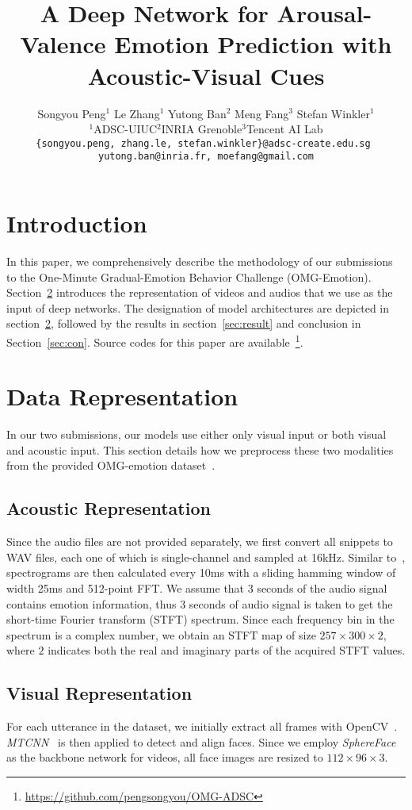 \documentclass[a4paper, 10pt, conference]{ieeeconf}      %
\title{\Large\bf
A Deep Network for Arousal-Valence Emotion Prediction with Acoustic-Visual Cues 
}
\author{Songyou Peng$^{1}$ \qquad Le Zhang$^{1}$ \qquad Yutong Ban$^{2}$ \qquad Meng Fang$^{3}$ \qquad Stefan Winkler$^{1}$%
\\
{$^{1}$ADSC-UIUC\qquad $^{2}$INRIA Grenoble\qquad $^{3}$Tencent AI Lab}\\
{\tt\footnotesize \{songyou.peng, zhang.le, stefan.winkler\}@adsc-create.edu.sg 
}\\
{\tt\footnotesize yutong.ban@inria.fr, moefang@gmail.com}
}
\begin{document}
\maketitle
\thispagestyle{empty}
\pagestyle{empty}
\section{Introduction}
In this paper, we comprehensively describe the methodology of our submissions to the One-Minute Gradual-Emotion Behavior Challenge (OMG-Emotion).
Section~\ref{sec:data} introduces the representation of videos and audios that we use as the input of deep networks. 
The designation of model architectures are depicted in section~\ref{sec:data}, followed by the results in section~\ref{sec:result} and conclusion in Section~\ref{sec:con}. Source codes for this paper are available~\footnote{\url{https://github.com/pengsongyou/OMG-ADSC}}.

\section{Data Representation}
\label{sec:data}
In our two submissions, our models use either only visual input or both visual and acoustic input.
This section details how we preprocess these two modalities from the provided OMG-emotion dataset~\cite{barros2018omg}.

\subsection{Acoustic Representation}
Since the audio files are not provided separately, we first convert all snippets to WAV files, each one of which is single-channel and sampled at 16kHz.
Similar to~\cite{Nagrani17}, spectrograms are then calculated every 10ms with a sliding hamming window of width 25ms and 512-point FFT.
We assume that 3 seconds of the audio signal contains emotion information, thus 3 seconds of audio signal is taken to get the short-time Fourier transform (STFT) spectrum. Since each frequency bin in the spectrum is a complex number, we obtain an STFT map of size $257\times 300 \times 2$, where $2$ indicates both the real and imaginary parts of the acquired STFT values. 

\subsection{Visual Representation}
For each utterance in the dataset, we initially extract all frames with OpenCV~\cite{opencv_library}. \emph{MTCNN}~\cite{zhang2016joint} is then applied to detect and align faces.
Since we employ \emph{SphereFace}~\cite{liu2017sphereface} as the backbone network for videos, all face images are resized to $112\times 96\times 3$.
\end{document}
